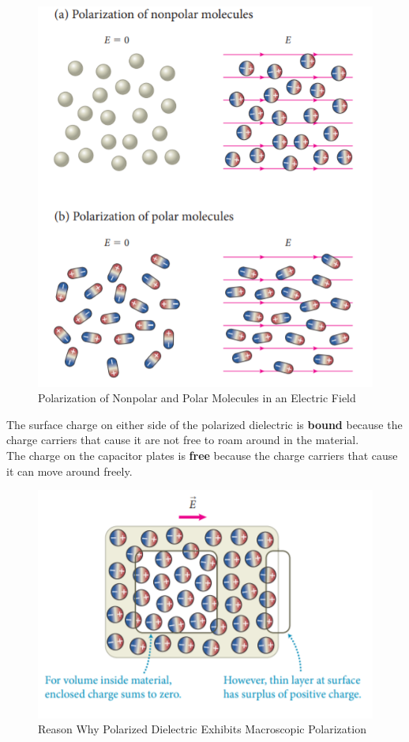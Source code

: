         \begin{figure}[hbt!]
            \centering
            \caption*{Polarization of Nonpolar and Polar Molecules in an Electric Field}
            \includegraphics[scale = 0.75]{Resources/26.3_Polarization}
        \end{figure}

        The surface charge on either side of the polarized dielectric is \textbf{bound} because the charge carriers that cause it are not free to roam around in the material. \\
        The charge on the capacitor plates is \textbf{free} because the charge carriers that cause it can move around freely.

        \begin{figure}[hbt!]
            \centering
            \caption*{Reason Why Polarized Dielectric Exhibits Macroscopic Polarization}
            \includegraphics[scale = 0.75]{Resources/26.3_Polarization2}
        \end{figure}

